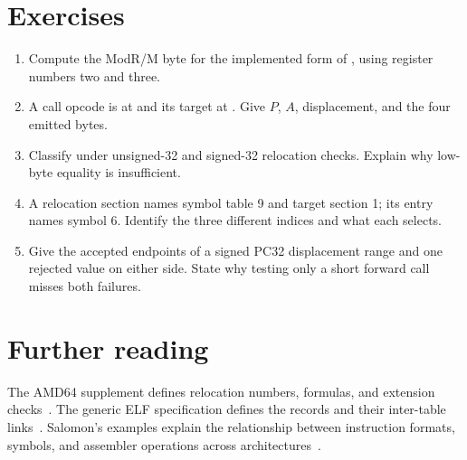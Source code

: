 \section{Exercises}
\label{sec:ch54-exercises}
\begin{enumerate}
\item\label{ex:ch54-modrm} Compute the ModR/M byte for the implemented form of , using register numbers two and three.
\item\label{ex:ch54-pcrel} A call opcode is at  and its target at . Give $P$, $A$, displacement, and the four emitted bytes.
\item\label{ex:ch54-width} Classify  under unsigned-32 and signed-32 relocation checks. Explain why low-byte equality is insufficient.
\item\label{ex:ch54-index} A relocation section names symbol table 9 and target section 1; its entry names symbol 6. Identify the three different indices and what each selects.
\item\label{ex:ch54-boundary} Give the accepted endpoints of a signed PC32 displacement range and one rejected value on either side. State why testing only a short forward call misses both failures.
\end{enumerate}

\section{Further reading}
\label{sec:ch54-reading}
The AMD64 supplement defines relocation numbers, formulas, and extension checks~\cite{matz-2012-amd64}.
The generic ELF specification defines the records and their inter-table links~\cite{xinuos-2026-elf}.
Salomon's examples explain the relationship between instruction formats, symbols, and assembler operations across architectures~\cite{salomon-1993-assemblers}.
